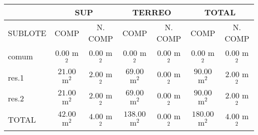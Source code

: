 \documentclass[10pt,a4paper]{report}
\begin{document}
  \begin{sidewaystable}
    \begin{tabular}{lcccccc}
       & \multicolumn{2}{c}{SUP} & \multicolumn{2}{c}{TERREO} & \multicolumn{2}{c}{TOTAL} \\
\hline
SUBLOTE & COMP & N. COMP & COMP & N. COMP & COMP & N. COMP \\
\hline
comum & $0.00$ m$^2$ & $0.00$ m$^2$ & $0.00$ m$^2$ & $0.00$ m$^2$ & $0.00$ m$^2$ & $0.00$ m$^2$ \\
res.1 & $21.00$ m$^2$ & $2.00$ m$^2$ & $69.00$ m$^2$ & $0.00$ m$^2$ & $90.00$ m$^2$ & $2.00$ m$^2$ \\
res.2 & $21.00$ m$^2$ & $2.00$ m$^2$ & $69.00$ m$^2$ & $0.00$ m$^2$ & $90.00$ m$^2$ & $2.00$ m$^2$ \\
TOTAL & $42.00$ m$^2$ & $4.00$ m$^2$ & $138.00$ m$^2$ & $0.00$ m$^2$ & $180.00$ m$^2$ & $4.00$ m$^2$ \\
\hline
    \end{tabular}
  \end{sidewaystable}
\end{document}
